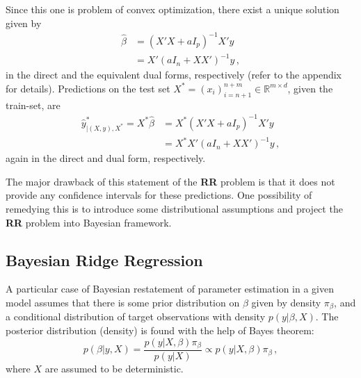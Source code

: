 \documentclass[a4paper,14pt]{article}
\newcommand{\Real}{\mathbb{R}}
\begin{document}
Since this one is problem of convex optimization, there exist a unique solution
given by 
\begin{align*}
  \hat{\beta}
    &= (X'X + a I_p)^{-1} X' y \\
    &= X' (a I_n + XX')^{-1} y \,,
\end{align*}
in the direct and the equivalent dual forms, respectively (refer to the appendix for
details). Predictions on the test set $X^* = (x_i)_{i=n+1}^{n+m}\in \Real^{m\times d}$,
given the train-set, are
\begin{align*}
  \hat{y}^*_{\vert(X,y), X^*} = X^* \hat{\beta}
    &= X^* (X'X + a I_p)^{-1} X' y \\ 
    &= X^* X' (a I_n + XX')^{-1} y \,,
\end{align*}
again in the direct and dual form, respectively.

The major drawback of this statement of the \textbf{RR} problem is that it does not
provide any confidence intervals for these predictions. One possibility of remedying
this is to introduce some distributional assumptions and project the \textbf{RR} problem
into Bayesian framework.


\subsection{Bayesian Ridge Regression} %
\label{sub:bayesian_ridge_regression}

A particular case of Bayesian restatement of parameter estimation in a given model
assumes that there is some prior distribution on $\beta$ given by density $\pi_\beta$,
and a conditional distribution of target observations with density $p(y|\beta, X)$.
The posterior distribution (density) is found with the help of Bayes theorem:
$$ p(\beta|y, X)
  = \frac{p(y|X, \beta) \pi_\beta}{p(y|X)}
  \propto p(y|X, \beta) \pi_\beta
  \,, $$
where $X$ are assumed to be deterministic.
\end{document}
